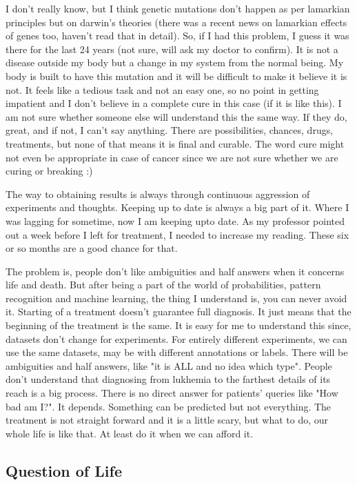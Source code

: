 I don't really know, but I think genetic mutations don't happen as per lamarkian principles but on darwin's 
theories (there was a recent news on lamarkian effects of genes too, haven't read that in detail). 
So, if I had this problem, I guess it was there for the last 24 years (not sure, will ask my doctor 
to confirm). It is not a disease outside my body but a change in my system from the normal being. My 
body is built to have this mutation and it will be difficult to make it believe it is not. It 
feels like a tedious task and not an easy one, so no point in getting impatient and I don't believe in 
a complete cure in this case (if it is like this). I am not sure whether someone else will 
understand this the same way. If they do, great, and if not, I can't say anything. There are 
possibilities, chances, drugs, treatments, but none of that  means it is final and curable. The 
word cure might not even be appropriate in case of cancer since we are not sure whether we are curing 
or breaking :)

The way to obtaining results is always through continuous aggression of experiments and thoughts. Keeping 
up to date is always a big part of it. Where I was lagging for sometime, now I am keeping upto date. 
As my professor pointed out a week before I left for treatment, I needed to increase my reading. 
These six or so months are a good chance for that. 

The problem is, people don't like ambiguities and half answers when it concerns life and death. 
But after being a part of the world of probabilities, pattern recognition and machine learning, the thing 
I understand is, you can never avoid it. Starting of a treatment doesn't guarantee full diagnosis. 
It just means that the beginning of the treatment is the same. It is easy for me to understand this since, 
datasets don't change for experiments. For entirely different experiments, we can use the same datasets, 
may be with different annotations or labels. There will be ambiguities and half answers, 
like "it is ALL and no idea which type". People don't understand that diagnosing from lukhemia to 
the farthest details of its reach is a big process. There is no direct answer for patients' queries 
like "How bad am I?". It depends. Something can be predicted but not everything. The treatment is not 
straight forward and it is a little scary, but what to do, our whole life is like that. At least do it 
when we can afford it. 

\subsection*{Question of Life} 

